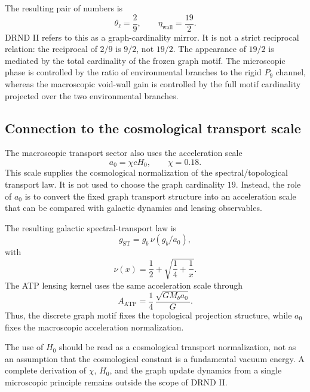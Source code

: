 \documentclass[12pt]{iopart}
\begin{document}
The resulting pair of numbers is
\begin{equation}
\theta_\ell=\frac{2}{9},
\qquad
\eta_{\mathrm{wall}}=\frac{19}{2}.
\end{equation}
DRND II refers to this as a graph-cardinality mirror. It is not a strict reciprocal relation: the reciprocal of \(2/9\) is \(9/2\), not \(19/2\). The appearance of \(19/2\) is mediated by the total cardinality of the frozen graph motif. The microscopic phase is controlled by the ratio of environmental branches to the rigid \(P_9\) channel, whereas the macroscopic void-wall gain is controlled by the full motif cardinality projected over the two environmental branches.

\subsection{Connection to the cosmological transport scale}

The macroscopic transport sector also uses the acceleration scale
\begin{equation}
a_0=\chi cH_0,
\qquad
\chi=0.18.
\end{equation}
This scale supplies the cosmological normalization of the spectral/topological transport law. It is not used to choose the graph cardinality \(19\). Instead, the role of \(a_0\) is to convert the fixed graph transport structure into an acceleration scale that can be compared with galactic dynamics and lensing observables.

The resulting galactic spectral-transport law is
\begin{equation}
g_{\mathrm{ST}}
=
g_b\,\nu(g_b/a_0),
\end{equation}
with
\begin{equation}
\nu(x)
=
\frac12+\sqrt{\frac14+\frac1x}.
\end{equation}
The ATP lensing kernel uses the same acceleration scale through
\begin{equation}
A_{\mathrm{ATP}}
=
\frac14\,\frac{\sqrt{GM_ba_0}}{G}.
\end{equation}
Thus, the discrete graph motif fixes the topological projection structure, while \(a_0\) fixes the macroscopic acceleration normalization.

The use of \(H_0\) should be read as a cosmological transport normalization, not as an assumption that the cosmological constant is a fundamental vacuum energy. A complete derivation of \(\chi\), \(H_0\), and the graph update dynamics from a single microscopic principle remains outside the scope of DRND II.
\end{document}

